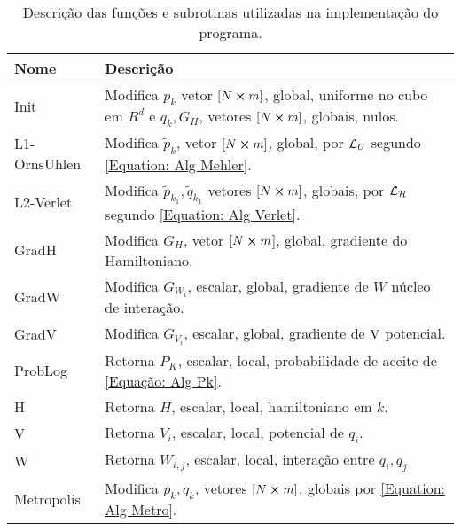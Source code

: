 \begin{table}[ht]
	\centering
	\begin{tabular}{ |p{2.6cm}||p{12cm}|  }
		\hline
		Nome & Descrição \\ 
		\hline
		\hline
		Init   		  	 & 
		Modifica ${p}_{k}$ vetor $[N\cross m]$, global, uniforme no cubo em $R^d$ e ${q}_{k}, G_H$, vetores $[N\cross m]$, globais, nulos. \\
		\hline
		L1-OrnsUhlen 	 & 
		Modifica $\tilde{p}_k$, vetor $[N\cross m]$, global, por $\operatorname{\mathcal{L}}_U$ segundo \ref{Equation: Alg Mehler}. \\
		\hline
		L2-Verlet  	 	 & 
		Modifica $\tilde{p}_{k_1},\tilde{q}_{k_1}$ vetores $[N\cross m]$, globais, por $\operatorname{\mathcal{L}}_{\operatorname{\mathcal{H}}}$ segundo \ref{Equation: Alg Verlet}.	\\
		\hline
		GradH         	 & 
		Modifica $G_H$, vetor $[N\cross m$], global, gradiente do Hamiltoniano.					\\
		\hline
		GradW        	 &
		Modifica $G_{W_i}$, escalar, global, gradiente de $W$ núcleo de interação.	\\
		\hline
		GradV  	      	 &
		Modifica $G_{V_i}$, escalar, global, gradiente de $\operatorname{V}$ potencial.		                    \\
		\hline
		ProbLog       		 &
		Retorna $P_K$, escalar, local, probabilidade de aceite de \ref{Equação: Alg Pk}. \\
		\hline
		H              	 &
		Retorna $H$, escalar, local, hamiltoniano em $k$.	 							\\
		\hline
		V  	      			 &
		Retorna $V_i$, escalar, local, potencial de $q_i$.								\\
		\hline
		W         	  		 & 
		Retorna $W_{i,j}$, escalar, local, interação entre $q_i,q_j$ 							\\
		\hline
		Metropolis     	 & 
		Modifica ${p}_{k},{q}_{k}$, vetores $[N\cross m]$, globais por \ref{Equation: Alg Metro}.								\\
		\hline
	\end{tabular}
	\caption{ Descrição das funções e subrotinas utilizadas na implementação do programa.}
	\label{Table: Funcoes e Subrotinas}
\end{table}

